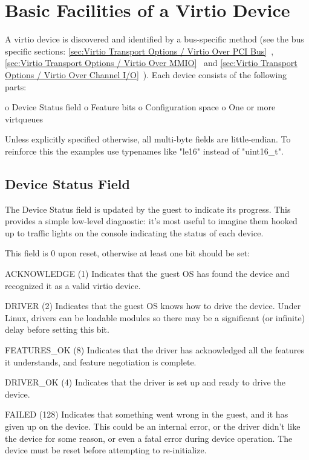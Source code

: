 \chapter{Basic Facilities of a Virtio Device}\label{sec:Basic Facilities of a Virtio Device}

A virtio device is discovered and identified by a bus-specific method
(see the bus specific sections: \ref{sec:Virtio Transport Options / Virtio Over PCI Bus}~,
\ref{sec:Virtio Transport Options / Virtio Over MMIO}~ and \ref{sec:Virtio Transport Options / Virtio Over Channel I/O}~).  Each
device consists of the following parts:

o Device Status field
o Feature bits
o Configuration space
o One or more virtqueues

Unless explicitly specified otherwise, all multi-byte fields are little-endian.
To reinforce this the examples use typenames like "le16" instead of "uint16_t".

\section{Device Status Field}\label{sec:Basic Facilities of a Virtio Device / Device Status Field}

The Device Status field is updated by the guest to indicate its
progress. This provides a simple low-level diagnostic: it's most
useful to imagine them hooked up to traffic lights on the console
indicating the status of each device.

This field is 0 upon reset, otherwise at least one bit should be set:

  ACKNOWLEDGE (1) Indicates that the guest OS has found the
  device and recognized it as a valid virtio device.

  DRIVER (2) Indicates that the guest OS knows how to drive the
  device. Under Linux, drivers can be loadable modules so there
  may be a significant (or infinite) delay before setting this
  bit.

  FEATURES_OK (8) Indicates that the driver has acknowledged all the
  features it understands, and feature negotiation is complete.

  DRIVER_OK (4) Indicates that the driver is set up and ready to
  drive the device.

  FAILED (128) Indicates that something went wrong in the guest,
  and it has given up on the device. This could be an internal
  error, or the driver didn't like the device for some reason, or
  even a fatal error during device operation. The device must be
  reset before attempting to re-initialize.

